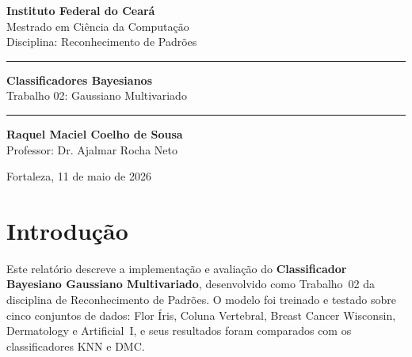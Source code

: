\documentclass[12pt, a4paper]{article}
\begin{document}

\begin{titlepage}
    \begin{flushleft}
        \Large \textbf{Instituto Federal do Ceará} \\
        \large Mestrado em Ciência da Computação \\
        \small Disciplina: Reconhecimento de Padrões
    \end{flushleft}
    \vspace{4cm}
    \begin{center}
        \hrule\vspace{0.5cm}
        {\huge \textbf{\color{brandblue} Classificadores Bayesianos}}\\
        \vspace{0.2cm}
        {\Large Trabalho 02: Gaussiano Multivariado}
        \vspace{0.5cm}\hrule
    \end{center}
    \vspace{3cm}
    \begin{flushright}
        \large \textbf{Raquel Maciel Coelho de Sousa}\\
        \small Professor: Dr. Ajalmar Rocha Neto
    \end{flushright}
    \vfill
    \begin{center}\small Fortaleza, 11 de maio de 2026 \end{center}
\end{titlepage}

\newpage
{\hypersetup{linkcolor=black}\tableofcontents}
\newpage

\section{Introdução}

Este relatório descreve a implementação e avaliação do
\textbf{Classificador Bayesiano Gaussiano Multivariado}, desenvolvido
como Trabalho~02 da disciplina de Reconhecimento de Padrões. O modelo
foi treinado e testado sobre cinco conjuntos de dados: Flor Íris,
Coluna Vertebral, Breast Cancer Wisconsin, Dermatology e Artificial~I, e seus resultados foram comparados
com os classificadores KNN e DMC.
\end{document}
